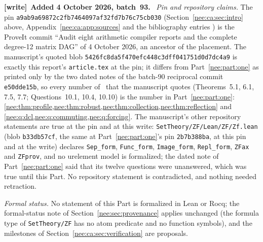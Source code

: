 \documentclass[11pt,letterpaper]{article}
\numberwithin{equation}{section}
\theoremstyle{plain}
\theoremstyle{definition}
\theoremstyle{remark}
\newenvironment{writenote}[1][]{\par\smallskip\begingroup\small\raggedright
 \setlength{\parindent}{1.25em}\noindent\textbf{[write]}\if\relax\detokenize{#1}\relax\else~\textbf{#1.}\fi\ }%
 {\par\endgroup\smallskip}
\begin{document}
\begin{writenote}[Added 4 October 2026, batch~93]
\emph{Pin and repository claims.} The pin \texttt{a9ab9a69872c2fb7464097af32fd7b76c75cb030} (Section~\ref{nee:ca:sec:intro} above, Appendix~\ref{nee:ca:app:sources} and the bibliography entries \cite{RepoNaming,RepoZFca}) is the ProveIt commit ``Audit eight arithmetic compiler reports and the complete degree-12 matrix DAG'' of 4 October 2026, an ancestor of the placement. The manuscript's quoted blob \texttt{5426fc8da5f470efc448c3dff041751d0d7dc4a9} is exactly this report's \texttt{article.tex} at the pin; it differs from Part~\ref{nee:part:one} as printed only by the two dated notes of the batch-90 reciprocal commit \texttt{e50dde15b}, so every number of~\cite{RepoNaming} that the manuscript quotes (Theorems~5.1, 6.1, 7.5, 7.7; Questions~10.1, 10.4, 10.10) is the number in Part~\ref{nee:part:one}: \cref{nee:thm:profile,nee:thm:robust,nee:thm:collection,nee:thm:reflection} and \cref{nee:q:dcl,nee:q:commuting,nee:q:forcing}. The manuscript's other repository statements are true at the pin and at this write: \nolinkurl{SetTheory/ZF/Lean/ZF/Zf.lean} (blob \texttt{b33db57cf}, the same at Part~\ref{nee:part:one}'s pin \texttt{2b7b388ba}, at this pin and at the write) declares \texttt{Sep\_form}, \texttt{Func\_form}, \texttt{Image\_form}, \texttt{Repl\_form}, \texttt{ZFax} and \texttt{ZFprov}, and no urelement model is formalized; the dated note of Part~\ref{nee:part:one} said that its twelve questions were unanswered, which was true until this Part. No repository statement is contradicted, and nothing needed retraction.

\emph{Formal status.} No statement of this Part is formalized in Lean or Rocq; the formal-status note of Section~\ref{nee:sec:provenance} applies unchanged (the formula type of \nolinkurl{SetTheory/ZF} has no atom predicate and no function symbols), and the milestones of Section~\ref{nee:ca:sec:verification} are proposals.


\end{writenote}
\end{document}
